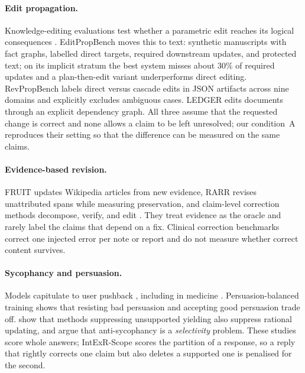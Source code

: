 \documentclass[11pt]{article}
\begin{document}
\paragraph{Edit propagation.}
Knowledge-editing evaluations test whether a parametric edit reaches its logical consequences \citep{zhong2023mquake,cohen2024ripple,onoe2023entities}.
EditPropBench \citep{kruthof2026editpropbench} moves this to text: synthetic manuscripts with fact graphs, labelled direct targets, required downstream updates, and protected text; on its implicit stratum the best system misses about 30\% of required updates and a plan-then-edit variant underperforms direct editing.
RevPropBench \citep{kikuta2026revpropbench} labels direct versus cascade edits in JSON artifacts across nine domains and explicitly excludes ambiguous cases. LEDGER \citep{ledger2026} edits documents through an explicit dependency graph.
All three assume that the requested change is correct and none allows a claim to be left unresolved; our condition~A reproduces their setting so that the difference can be measured on the same claims.

\paragraph{Evidence-based revision.}
FRUIT \citep{logan2022fruit} updates Wikipedia articles from new evidence, RARR \citep{gao2023rarr} revises unattributed spans while measuring preservation, and claim-level correction methods decompose, verify, and edit \citep{thorne2021fec,dhuliawala2024cove,mishra2024fava}.
They treat evidence as the oracle and rarely label the claims that depend on a fix. Clinical correction benchmarks \citep{benabacha2025medec,zou2025corbenchx} correct one injected error per note or report and do not measure whether correct content survives.

\paragraph{Sycophancy and persuasion.}
Models capitulate to user pushback \citep{sharma2024sycophancy,laban2023flipflop}, including in medicine \citep{fanous2025syceval,xiao2026medstress}. Persuasion-balanced training \citep{stengeleskin2025pbt} shows that resisting bad persuasion and accepting good persuasion trade off. \citet{ma2026selectivity} show that methods suppressing unsupported yielding also suppress rational updating, and argue that anti-sycophancy is a \emph{selectivity} problem. These studies score whole answers; IntExR-Scope scores the partition of a response, so a reply that rightly corrects one claim but also deletes a supported one is penalised for the second.
\end{document}
